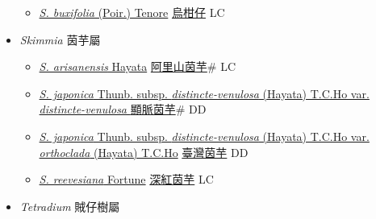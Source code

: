 \begin{itemize}
  \begin{itemize}
        \item[] \href{http://www.theplantlist.org/tpl1.1/search?q=Severinia+buxifolia}{\textit{S. buxifolia} (Poir.) Tenore}   \href{\detokenize{http://taibnet.sinica.edu.tw/chi/taibnet_species_list.php?T2=烏柑仔&T2_new_value=true&fr=y}}{烏柑仔} LC
  \end{itemize}
 \item[] \textit{Skimmia} 茵芋屬
                    
  \begin{itemize}
        \item[] \href{http://www.theplantlist.org/tpl1.1/search?q=Skimmia+arisanensis}{\textit{S. arisanensis} Hayata}   \href{\detokenize{http://taibnet.sinica.edu.tw/chi/taibnet_species_list.php?T2=阿里山茵芋&T2_new_value=true&fr=y}}{阿里山茵芋}\# LC
        \item[] \href{http://www.theplantlist.org/tpl1.1/search?q=Skimmia+japonica+subsp.+distincte-venulosa+var.+distincte-venulosa}{\textit{S. japonica} Thunb. subsp. \textit{distincte-venulosa} (Hayata) T.C.Ho var. \textit{distincte-venulosa} }   \href{\detokenize{http://taibnet.sinica.edu.tw/chi/taibnet_species_list.php?T2=顯脈茵芋&T2_new_value=true&fr=y}}{顯脈茵芋}\# DD
        \item[] \href{http://www.theplantlist.org/tpl1.1/search?q=Skimmia+japonica+subsp.+distincte-venulosa+var.+orthoclada}{\textit{S. japonica} Thunb. subsp. \textit{distincte-venulosa} (Hayata) T.C.Ho var. \textit{orthoclada} (Hayata) T.C.Ho}   \href{\detokenize{http://taibnet.sinica.edu.tw/chi/taibnet_species_list.php?T2=臺灣茵芋&T2_new_value=true&fr=y}}{臺灣茵芋} DD
        \item[] \href{http://www.theplantlist.org/tpl1.1/search?q=Skimmia+reevesiana}{\textit{S. reevesiana} Fortune}   \href{\detokenize{http://taibnet.sinica.edu.tw/chi/taibnet_species_list.php?T2=深紅茵芋&T2_new_value=true&fr=y}}{深紅茵芋} LC
  \end{itemize}
 \item[] \textit{Tetradium} 賊仔樹屬
                    

\end{itemize}
